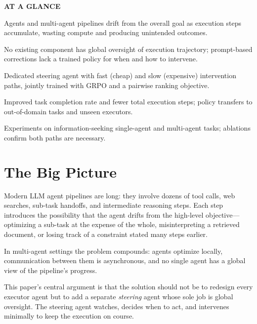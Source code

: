 \documentclass[10pt,twocolumn]{article}
\begin{document}
\begin{mdframed}[backgroundcolor=boxgray,linecolor=rulered,linewidth=1pt,
    innerleftmargin=6pt,innerrightmargin=6pt,
    innertopmargin=6pt,innerbottommargin=6pt]
\textbf{\small AT A GLANCE}\par\vspace{4pt}
\begin{description}[leftmargin=0pt,labelsep=4pt,itemsep=2pt,parsep=0pt,
    font=\small\bfseries]
  \item[Problem:] Agents and multi-agent pipelines drift from the overall
    goal as execution steps accumulate, wasting compute and producing
    unintended outcomes.
  \item[Why it matters:] No existing component has global oversight of
    execution trajectory; prompt-based corrections lack a trained policy
    for when and how to intervene.
  \item[Method:] Dedicated steering agent with fast (cheap) and slow
    (expensive) intervention paths, jointly trained with GRPO and a
    pairwise ranking objective.
  \item[Result:] Improved task completion rate and fewer total execution
    steps; policy transfers to out-of-domain tasks and unseen executors.
  \item[Evidence:] Experiments on information-seeking single-agent and
    multi-agent tasks; ablations confirm both paths are necessary.
\end{description}
\end{mdframed}

\section{The Big Picture}

Modern LLM agent pipelines are long: they involve dozens of tool calls,
web searches, sub-task handoffs, and intermediate reasoning steps. Each
step introduces the possibility that the agent drifts from the high-level
objective—optimizing a sub-task at the expense of the whole, misinterpreting
a retrieved document, or losing track of a constraint stated many steps
earlier.

In multi-agent settings the problem compounds: agents optimize locally,
communication between them is asynchronous, and no single agent has a
global view of the pipeline's progress.

This paper's central argument is that the solution should not be to redesign
every executor agent but to add a separate \textit{steering} agent whose
sole job is global oversight. The steering agent watches, decides when to
act, and intervenes minimally to keep the execution on course.
\end{document}
